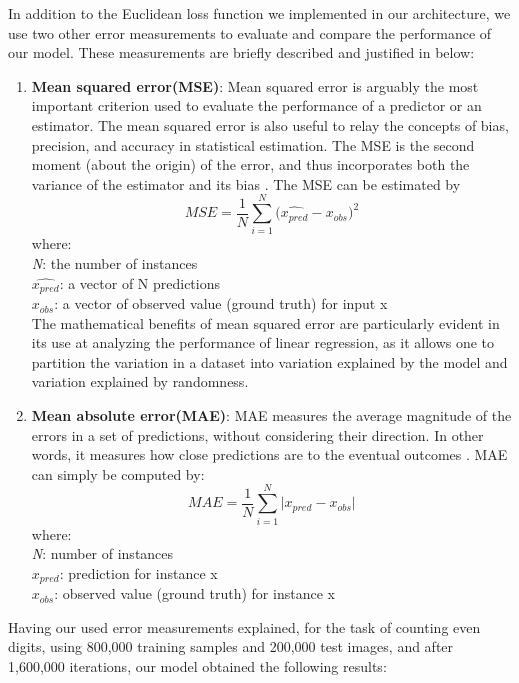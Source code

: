 In addition to the Euclidean loss function we implemented in our architecture, we use two other error measurements to evaluate and compare the performance of our model. These measurements are briefly described and justified in below:
\begin{enumerate}
\item \textbf{Mean squared error(MSE)}: Mean squared error is arguably the most important criterion used to evaluate the performance of a predictor or an estimator. The mean squared error is also useful to relay the concepts of bias, precision, and accuracy in statistical estimation. The MSE is the second moment (about the origin) of the error, and thus incorporates both the variance of the estimator and its bias \cite{lehmann1998theory}. The MSE can be estimated by
$$MSE = {\frac{1} {N}{\sum\limits_{i = 1}^N {(\hat{x_{pred}} - x_{obs} } })^{2} } $$
where:\\
\textit{N}: the number of instances\\
\textit{ $\hat{x_{pred}}$}: a vector of N predictions\\
\textit{$x_{obs}$}: a vector of observed value (ground truth) for input x\\

The mathematical benefits of mean squared error are particularly evident in its use at analyzing the performance of linear regression, as it allows one to partition the variation in a dataset into variation explained by the model and variation explained by randomness.
\item \textbf{Mean absolute error(MAE)}: MAE measures the average magnitude of the errors in a set of predictions, without considering their direction. In other words, it measures how close predictions are to the eventual outcomes \cite{willmott2005advantages}. MAE can simply be computed by:
$$MAE = {\frac{1} {N}{\sum\limits_{i = 1}^N {|x_{pred} - x_{obs} } }| } $$
where:\\
\textit{N}: number of instances\\
\textit{ $x_{pred}$}: prediction for instance x\\
\textit{$x_{obs}$}: observed value (ground truth) for instance x
\end{enumerate}

\noindent Having our used error measurements explained, for the task of counting even digits, using 800,000 training samples and 200,000 test images, and after 1,600,000 iterations, our model obtained the following results:


